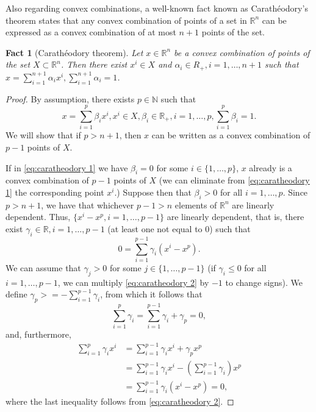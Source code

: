 \documentclass[smallextended,numbook,nospthms]{svjour3}
\theoremstyle{plain}
\newtheorem{fact}[theorem]{Fact}
\theoremstyle{definition}
\def\RR{\mathds R}
\def\NN{\mathds N}
\begin{document}
Also regarding convex combinations, a well-known fact known as Carathéodory's theorem states that any convex combination of points of a set in $\RR^{n}$ can be expressed as a convex combination of at most $n+1$ points of the set.
\begin{fact}[Carathéodory theorem]\label{fact:caratheodory}
Let $x \in \RR^{n}$ be a convex combination of points of the set $X \subset \RR^{n}$. Then there exist $x^{i} \in X$ and $\alpha_{i} \in R_{+}, i=1, \ldots, n+1$ such that $x=\sum_{i=1}^{n+1} \alpha_{i} x^{i}, \sum_{i=1}^{n+1} \alpha_{i}=1$.
\end{fact}
\begin{proof}
	By assumption, there exists $p \in \NN$ such that
	\[
	x=\sum_{i=1}^{p} \beta_{i} x^{i}, x^{i} \in X, \beta_{i} \in \RR_{+}, i=1, \ldots, p, \sum_{i=1}^{p} \beta_{i}=1. \label{eq:caratheodory 1}
	\]
	We will show that if $p > n+1$, then $x$ can be written as a convex combination of $p-1$ points of $X$.
	
	If in \cref{eq:caratheodory 1} we have $\beta_{i}=0$ for some $i \in \{1,\ldots,p\}$, $x$ already is a convex combination of $p-1$ points of $X$ (we can eliminate from \cref{eq:caratheodory 1} the corresponding point $x^i$.) Suppose then that $\beta_{i}>0$ for all $i=1,\ldots,p$. Since $p>n+1$, we have that whichever $p-1>n$ elements of $\RR^n$ are linearly dependent. Thus, $\{x^i-x^p, i =1,\ldots,p-1\}$ are linearly dependent, that is, there exist $\gamma_{i} \in \RR, i=1,\ldots,p-1$ (at least one not equal to 0) such that
	\[
	0=\sum_{i=1}^{p-1} \gamma_{i}\left(x^{i}-x^{p}\right) \label{eq:caratheodory 2}.
	\]
	We can assume that $\gamma_{j}>0$ for some $j \in\{1, \ldots, p-1\}$ (if $\gamma_{i} \leq 0$ for all $i=1, \ldots, p-1$, we can multiply \cref{eq:caratheodory 2} by $-1$ to change signs). We define $\gamma_{p}>=-\sum_{i=1}^{p-1} \gamma_{i}$, from which it follows that
	\[
	\sum_{i=1}^{p} \gamma_{i}=\sum_{i=1}^{p-1} \gamma_{i}+\gamma_{p}=0, \label{eq:caratheodory 3}
	\]
	and, furthermore,
	\begin{align}
		\sum_{i=1}^{p} \gamma_{i} x^{i} &=\sum_{i=1}^{p-1} \gamma_{i} x^{i}+\gamma_{p} x^{p} \\
		&=\sum_{i=1}^{p-1} \gamma_{i} x^{i}-\left(\sum_{i=1}^{p-1} \gamma_{i}\right) x^{p} \\
		&=\sum_{i=1}^{p-1} \gamma_{i}\left(x^{i}-x^{p}\right)=0, \label{eq:caratheodory 4}
	\end{align}
	where the last inequality follows from \cref{eq:caratheodory 2}.
	

\end{proof}
\end{document}
